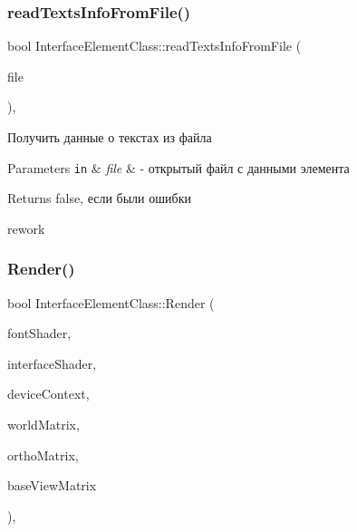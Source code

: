 \subsubsection{\texorpdfstring{read\+Texts\+Info\+From\+File()}{readTextsInfoFromFile()}}
{\footnotesize\ttfamily bool Interface\+Element\+Class\+::read\+Texts\+Info\+From\+File (\begin{DoxyParamCaption}\item[{std\+::ifstream $\ast$}]{file }\end{DoxyParamCaption})\hspace{0.3cm}{\ttfamily [protected]}, {\ttfamily [inherited]}}



Получить данные о текстах из файла 


\begin{DoxyParams}[1]{Parameters}
\mbox{\tt in}  & {\em file} & -\/ открытый файл с данными элемента \\
\hline
\end{DoxyParams}
\begin{DoxyReturn}{Returns}
false, если были ошибки 
\end{DoxyReturn}
rework \mbox{\label{class_interface_element_class_a18b876383a39bb3fb1a6325f6518befc}} 
\subsubsection{\texorpdfstring{Render()}{Render()}}
{\footnotesize\ttfamily bool Interface\+Element\+Class\+::\+Render (\begin{DoxyParamCaption}\item[{\hyperlink{class_font_shader_class}{Font\+Shader\+Class} $\ast$}]{font\+Shader,  }\item[{\hyperlink{class_interface_shader_class}{Interface\+Shader\+Class} $\ast$}]{interface\+Shader,  }\item[{I\+D3\+D11\+Device\+Context $\ast$}]{device\+Context,  }\item[{D3\+D\+X\+M\+A\+T\+R\+IX}]{world\+Matrix,  }\item[{D3\+D\+X\+M\+A\+T\+R\+IX}]{ortho\+Matrix,  }\item[{D3\+D\+X\+M\+A\+T\+R\+IX}]{base\+View\+Matrix }\end{DoxyParamCaption})\hspace{0.3cm}{\ttfamily [virtual]}, {\ttfamily [inherited]}}

